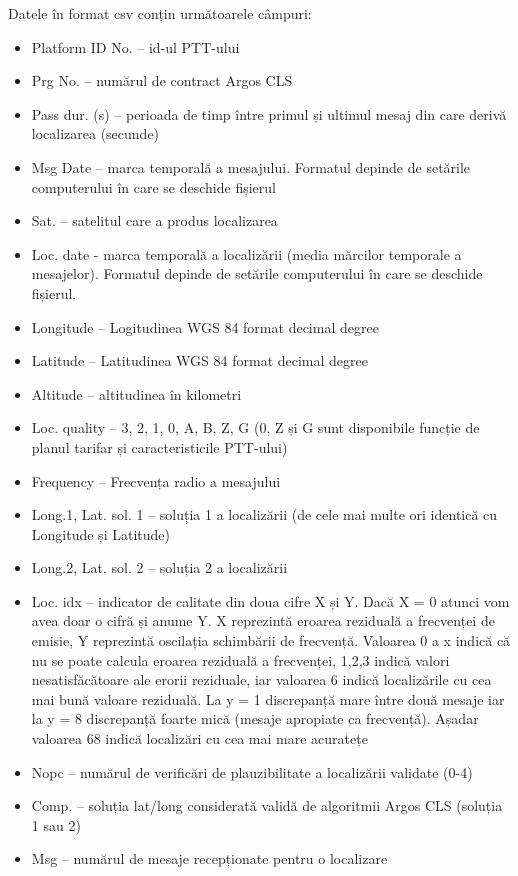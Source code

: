\documentclass[11pt,onehalfspacing]{elife}
\begin{document}
Datele în format csv conțin următoarele câmpuri:
\begin{itemize}
    \item Platform ID No. – id-ul PTT-ului
    \item Prg No. – numărul de contract Argos CLS
    \item Pass dur. (s) – perioada de timp între primul și ultimul mesaj din care derivă localizarea (secunde)
    \item Msg Date – marca temporală a mesajului. Formatul depinde de setările computerului în care se deschide fișierul
    \item Sat. – satelitul care a produs localizarea
    \item Loc. date - marca temporală a localizării (media mărcilor temporale a mesajelor). Formatul depinde de setările computerului în care se deschide fișierul.
    \item Longitude – Logitudinea WGS 84 format decimal degree
    \item Latitude – Latitudinea WGS 84 format decimal degree
    \item Altitude – altitudinea în kilometri
    \item Loc. quality – 3, 2, 1, 0, A, B, Z, G (0, Z și G sunt disponibile funcție de planul tarifar și caracteristicile PTT-ului)
    \item Frequency – Frecvența radio a mesajului
    \item Long.1, Lat. sol. 1 – soluția 1 a localizării (de cele mai multe ori identică cu Longitude și Latitude)
    \item Long.2, Lat. sol. 2 – soluția 2 a localizării
    \item Loc. idx – indicator de calitate din doua cifre X și Y. Dacă X = 0 atunci vom avea doar o cifră și anume Y. X reprezintă eroarea reziduală a frecvenței de emisie, Y reprezintă oscilația schimbării de frecvență. Valoarea 0 a x indică că nu se poate calcula eroarea reziduală a frecvenței, 1,2,3 indică valori nesatisfăcătoare ale erorii reziduale, iar valoarea 6 indică localizările cu cea mai bună valoare reziduală. La y = 1 discrepanță mare între două mesaje iar la y = 8 discrepanță foarte mică (mesaje apropiate ca frecvență). Așadar valoarea 68 indică localizări cu cea mai mare acuratețe
    \item Nopc – numărul de verificări de plauzibilitate a localizării validate (0-4)
    \item Comp. – soluția lat/long considerată validă de algoritmii Argos CLS (soluția 1 sau 2)
    \item Msg – numărul de mesaje recepționate pentru o localizare

\end{itemize}
\end{document}
